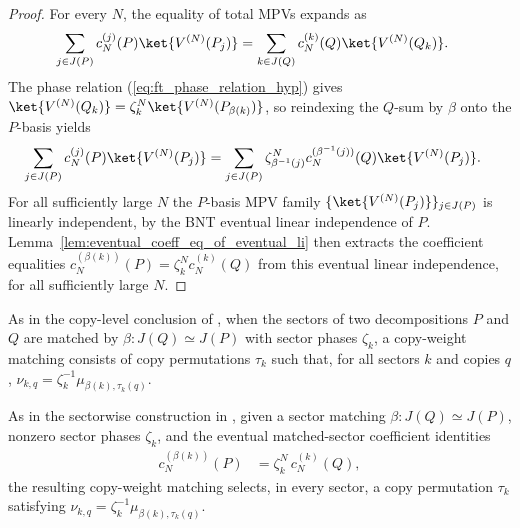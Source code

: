 \begin{proof}\leanok
    For every $N$, the equality of total MPVs expands as
    \begin{align}
        \sum_{j\in J(P)} c_N^{(j)}(P)\ket{V^{(N)}(P_j)}
         & =
        \sum_{k\in J(Q)} c_N^{(k)}(Q)\ket{V^{(N)}(Q_k)}.
        \notag
    \end{align}
    The phase relation (\ref{eq:ft_phase_relation_hyp}) gives
    $\ket{V^{(N)}(Q_k)}=\zeta_k^N\ket{V^{(N)}(P_{\beta(k)})}$, so reindexing
    the $Q$-sum by $\beta$ onto the $P$-basis yields
    \begin{align}
        \sum_{j\in J(P)} c_N^{(j)}(P)\ket{V^{(N)}(P_j)}
         & =
        \sum_{j\in J(P)}
        \zeta_{\beta^{-1}(j)}^N
        c_N^{(\beta^{-1}(j))}(Q)\ket{V^{(N)}(P_j)}.
        \notag
    \end{align}
    For all sufficiently large $N$ the $P$-basis MPV family
    $\{\ket{V^{(N)}(P_j)}\}_{j\in J(P)}$ is linearly independent, by the BNT
    eventual linear independence of $P$. Lemma~\ref{lem:eventual_coeff_eq_of_eventual_li}
    then extracts the coefficient equalities
    $c_N^{(\beta(k))}(P)=\zeta_k^Nc_N^{(k)}(Q)$ from this eventual linear
    independence, for all sufficiently large $N$.
\end{proof}

\begin{definition}%
    \label{def:sector_bnt_copy_weight_matching}
    \leanok
    As in the copy-level conclusion of
    \cite[Appendix MPV proof, line~1188]{Cirac2016MPDO_arXiv}, when the
    sectors of two decompositions $P$ and $Q$ are matched by
    $\beta:J(Q)\simeq J(P)$ with sector phases $\zeta_k$, a copy-weight
    matching consists of copy permutations $\tau_k$ such that, for all sectors
    $k$ and copies $q$, $\nu_{k,q}=\zeta_k^{-1}\mu_{\beta(k),\tau_k(q)}$.
\end{definition}

\begin{definition}%
    \label{def:sector_bnt_copy_weight_matching_of_coeff_identity}
    \leanok
    As in the sectorwise construction in
    \cite[Appendix MPV proof, line~1188]{Cirac2016MPDO_arXiv}, given a sector
    matching $\beta:J(Q)\simeq J(P)$, nonzero sector phases $\zeta_k$, and the
    eventual matched-sector coefficient identities
    \begin{align}
        c_N^{(\beta(k))}(P)
         & = \zeta_k^N\,c_N^{(k)}(Q),
        \label{eq:ft_sector_coeff_identity_hyp}
    \end{align}
    the resulting copy-weight matching selects, in every sector, a copy
    permutation $\tau_k$ satisfying
    $\nu_{k,q}=\zeta_k^{-1}\mu_{\beta(k),\tau_k(q)}$.
\end{definition}

